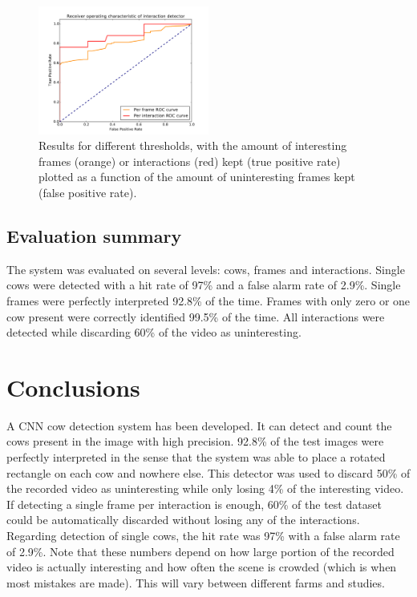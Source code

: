 \documentclass{cta-author}
\begin{document}
\begin{figure}[tb]
\begin{center}
  \includegraphics[width=0.5\textwidth]{roc.pdf}
\end{center}
  \caption{Results for different thresholds, with the amount of interesting frames (orange) or interactions
(red) kept (true positive rate) plotted as a function of the amount of uninteresting frames kept (false
positive rate).}
  \label{fig:roc}
\end{figure}

\subsection{Evaluation summary}
The system was evaluated on several levels: cows, frames and interactions. Single cows were detected with a hit rate of 97\% and a false alarm rate of 2.9\%. Single frames were perfectly interpreted 92.8\% of the time. Frames with only zero or one cow present were correctly identified 99.5\% of the time. All interactions were detected while discarding 60\% of the video as uninteresting.

\section{Conclusions}
A CNN cow detection system has been developed. It can detect and count the cows present in the image with
high precision. 92.8\% of the test images were perfectly interpreted in the sense that the system was able
to place a rotated rectangle on each cow and nowhere else. This detector was used to discard 50\% of the
recorded video as uninteresting while only losing 4\% of the interesting video. If detecting a single frame
per interaction is enough, 60\% of the test dataset could be automatically discarded without losing any of the
interactions. Regarding detection of single cows, the hit rate was 97\% with a false alarm rate of 2.9\%.
Note that these numbers depend on how large portion of the recorded video is actually interesting and how
often the scene is crowded (which is when most mistakes are made). This will vary between different farms and
studies.
\end{document}
